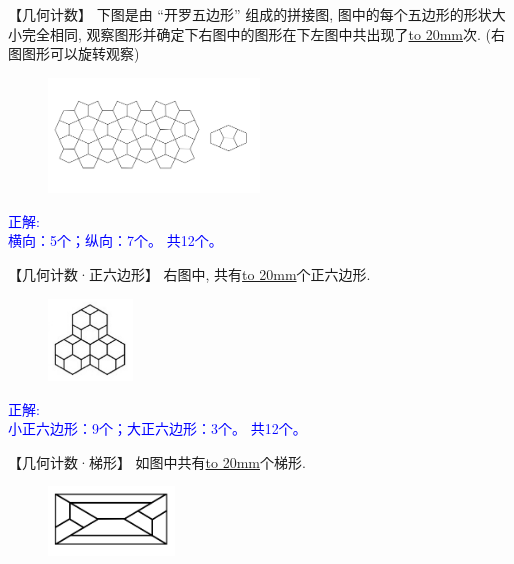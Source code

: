 \item {
    【几何计数】
    下图是由 ``开罗五边形'' 组成的拼接图, 图中的每个五边形的形状大小完全相同, 观察图形并确定下右图中的图形在下左图中共出现了\underline{\hbox to 20mm{}}次. (右图图形可以旋转观察)
    \begin{figure}[H] 
        \centering
        \includegraphics[width=0.5\textwidth]{./pics/Chapter_4/8.png}
    \end{figure}
    \ifshowSolution 
        \fangsong{}\textcolor{blue}{
            正解: \\
            横向：5个；纵向：7个。
            共12个。
        }
    \else
        \vspace{1cm}
    \fi
}

\item {
    【几何计数·正六边形】
    右图中, 共有\underline{\hbox to 20mm{}}个正六边形.
    \begin{figure}[H] 
        \centering
        \includegraphics[width=0.2\textwidth]{./pics/Chapter_4/14.png}
    \end{figure}
    \ifshowSolution 
        \fangsong{}\textcolor{blue}{
            正解: \\
            小正六边形：9个；大正六边形：3个。
            共12个。
        }
    \else
        \vspace{1cm}
    \fi
}

\item {
    【几何计数·梯形】
    如图中共有\underline{\hbox to 20mm{}}个梯形.
    \begin{figure}[H] 
        \centering
        \includegraphics[width=0.3\textwidth]{./pics/Chapter_4/2016_1.png}
    \end{figure}
}

